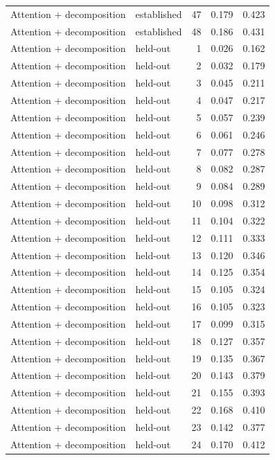 \begin{tabular}{llrrr}
Attention + decomposition & established & 47 & 0.179 & 0.423 \\
Attention + decomposition & established & 48 & 0.186 & 0.431 \\
Attention + decomposition & held-out & 1 & 0.026 & 0.162 \\
Attention + decomposition & held-out & 2 & 0.032 & 0.179 \\
Attention + decomposition & held-out & 3 & 0.045 & 0.211 \\
Attention + decomposition & held-out & 4 & 0.047 & 0.217 \\
Attention + decomposition & held-out & 5 & 0.057 & 0.239 \\
Attention + decomposition & held-out & 6 & 0.061 & 0.246 \\
Attention + decomposition & held-out & 7 & 0.077 & 0.278 \\
Attention + decomposition & held-out & 8 & 0.082 & 0.287 \\
Attention + decomposition & held-out & 9 & 0.084 & 0.289 \\
Attention + decomposition & held-out & 10 & 0.098 & 0.312 \\
Attention + decomposition & held-out & 11 & 0.104 & 0.322 \\
Attention + decomposition & held-out & 12 & 0.111 & 0.333 \\
Attention + decomposition & held-out & 13 & 0.120 & 0.346 \\
Attention + decomposition & held-out & 14 & 0.125 & 0.354 \\
Attention + decomposition & held-out & 15 & 0.105 & 0.324 \\
Attention + decomposition & held-out & 16 & 0.105 & 0.323 \\
Attention + decomposition & held-out & 17 & 0.099 & 0.315 \\
Attention + decomposition & held-out & 18 & 0.127 & 0.357 \\
Attention + decomposition & held-out & 19 & 0.135 & 0.367 \\
Attention + decomposition & held-out & 20 & 0.143 & 0.379 \\
Attention + decomposition & held-out & 21 & 0.155 & 0.393 \\
Attention + decomposition & held-out & 22 & 0.168 & 0.410 \\
Attention + decomposition & held-out & 23 & 0.142 & 0.377 \\
Attention + decomposition & held-out & 24 & 0.170 & 0.412 \\

\end{tabular}

